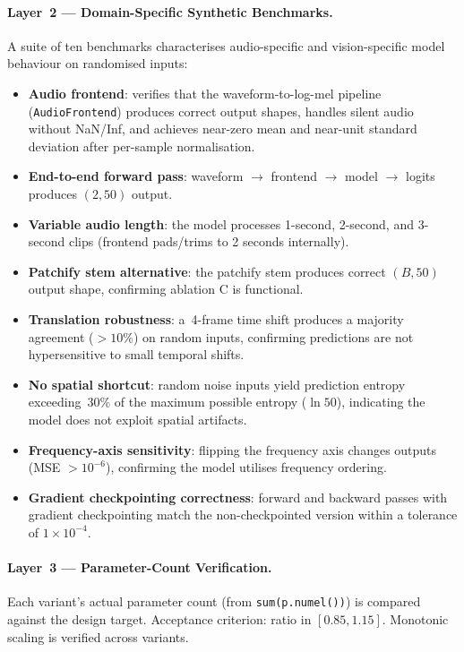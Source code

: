 \documentclass{article}
\begin{document}
\paragraph{Layer~2 --- Domain-Specific Synthetic Benchmarks.}
A suite of ten benchmarks characterises audio-specific and vision-specific model
behaviour on randomised inputs:
\begin{itemize}
  \item \textbf{Audio frontend}: verifies that the waveform-to-log-mel pipeline
  (\texttt{AudioFrontend}) produces correct output shapes, handles silent audio
  without NaN/Inf, and achieves near-zero mean and near-unit standard deviation
  after per-sample normalisation.
  \item \textbf{End-to-end forward pass}: waveform $\rightarrow$ frontend
  $\rightarrow$ model $\rightarrow$ logits produces $(2, 50)$ output.
  \item \textbf{Variable audio length}: the model processes 1-second, 2-second,
  and 3-second clips (frontend pads/trims to 2 seconds internally).
  \item \textbf{Patchify stem alternative}: the patchify stem produces correct
  $(B, 50)$ output shape, confirming ablation C is functional.
  \item \textbf{Translation robustness}: a~4-frame time shift produces a
  majority agreement ($>10\%$) on random inputs, confirming predictions are not
  hypersensitive to small temporal shifts.
  \item \textbf{No spatial shortcut}: random noise inputs yield prediction
  entropy exceeding~30\% of the maximum possible entropy ($\ln 50$), indicating
  the model does not exploit spatial artifacts.
  \item \textbf{Frequency-axis sensitivity}: flipping the frequency axis changes
  outputs (MSE $> 10^{-6}$), confirming the model utilises frequency ordering.
  \item \textbf{Gradient checkpointing correctness}: forward and backward passes
  with gradient checkpointing match the non-checkpointed version within a
  tolerance of $1\times10^{-4}$.
\end{itemize}

\paragraph{Layer~3 --- Parameter-Count Verification.}
Each variant's actual parameter count (from \texttt{sum(p.numel())}) is
compared against the design target. Acceptance criterion: ratio in $[0.85, 1.15]$.
Monotonic scaling is verified across variants.
\end{document}
